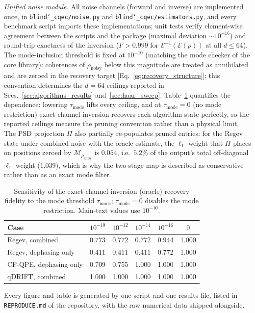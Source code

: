 \documentclass[12pt,a4paper]{article}
\newcommand{\EE}{\mathcal{E}}
\newcommand{\rhon}{\rho_\mathrm{noisy}}
\begin{document}
\emph{Unified noise module.}
All noise channels (forward and inverse) are implemented once, in \texttt{blind\char`\_cqec/noise.py} and \texttt{blind\char`\_cqec/estimators.py}, and every benchmark script imports these implementations; unit tests verify element-wise agreement between the scripts and the package (maximal deviation $\sim 10^{-16}$) and round-trip exactness of the inversion ($F > 0.999$ for $\EE^{-1}(\EE(\rho))$ at all $d \leq 64$).
The mode-inclusion threshold is fixed at $10^{-10}$ (matching the mode checker of the core library): coherences of $\rhon$ below this magnitude are treated as annihilated and are zeroed in the recovery target [Eq.~\eqref{eq:recovery_structure}]; this convention determines the $d = 64$ ceilings reported in Secs.~\ref{sec:algorithms_results} and~\ref{sec:haar_sweep}.
Table~\ref{tab:tau_sensitivity} quantifies the dependence: lowering $\tau_\mathrm{mode}$ lifts every ceiling, and at $\tau_\mathrm{mode} = 0$ (no mode restriction) exact channel inversion recovers each algorithm state perfectly, so the reported ceilings measure the pruning convention rather than a physical limit.
The PSD projection $\Pi$ also partially re-populates pruned entries: for the Regev state under combined noise with the oracle estimate, the $\ell_1$ weight that $\Pi$ places on positions zeroed by $\mathcal{M}_{\rhon}$ is $0.054$, i.e.\ $5.2\%$ of the output's total off-diagonal $\ell_1$ weight ($1.039$), which is why the two-stage map is described as conservative rather than as an exact mode filter.

\begin{table}[!tb]
\caption{Sensitivity of the exact-channel-inversion (oracle) recovery fidelity to the mode threshold $\tau_\mathrm{mode}$; $\tau_\mathrm{mode} = 0$ disables the mode restriction. Main-text values use $10^{-10}$.}
\label{tab:tau_sensitivity}
\begin{tabular}{lccccc}
Case & $10^{-10}$ & $10^{-12}$ & $10^{-14}$ & $10^{-16}$ & $0$ \\
\hline
Regev, combined            & 0.773 & 0.772 & 0.772 & 0.944 & 1.000 \\
Regev, dephasing only      & 0.411 & 0.411 & 0.411 & 0.772 & 1.000 \\
CF-QPE, dephasing only     & 0.709 & 0.755 & 1.000 & 1.000 & 1.000 \\
qDRIFT, combined           & 1.000 & 1.000 & 1.000 & 1.000 & 1.000 \\
\end{tabular}
\end{table}
Every figure and table is generated by one script and one results file, listed in \texttt{REPRODUCE.md} of the repository, with the raw numerical data shipped alongside.
\end{document}
